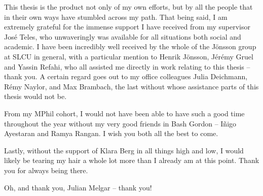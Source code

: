 
\begin{acknowledgements}
  This thesis is the product not only of my own efforts, but by all the people
  that in their own ways have stumbled across my path. That being said, I am
  extremely grateful for the immense support I have received from my supervisor
  José Teles, who unwaveringly was available for all situations both social and
  academic. I have been incredibly well received by the whole of
  the Jönsson group at SLCU in general, with a particular mention to Henrik Jönsson, Jérémy
  Gruel and Yassin Refahi, who all assisted me directly in work relating to this thesis
  -- thank you. A certain regard goes out to my office colleagues Julia
  Deichmann, Rémy Naylor, and Max Brambach, the last without whose assistance
  parts of this thesis would not be. 

  From my MPhil cohort, I would not have been able to have such a good time
  throughout the year without my very good friends in Bash Gordon -- I\~nigo
  Ayestaran and Ramya Rangan. I wish you both all the best to come.
  
  Lastly, without the support of Klara Berg in all things high and low, I would
  likely be tearing my hair a whole lot more than I already am at this point. Thank
  you for always being there.

  Oh, and thank you, Julian Melgar -- thank you!


\end{acknowledgements}

